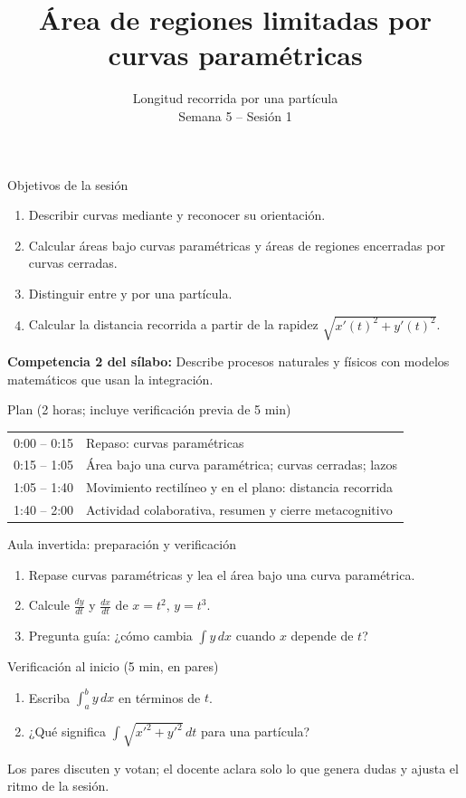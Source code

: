 \documentclass[10pt,aspectratio=169]{beamer}
\title[Paramétricas: área y distancia]{Área de regiones limitadas por curvas paramétricas}
\subtitle{Longitud recorrida por una partícula\\[2pt]\small Semana 5 -- Sesión 1}
\begin{document}
\begin{frame}
  \titlepage
\end{frame}

\begin{frame}{Objetivos de la sesión}
  \begin{enumerate}
    \item Describir curvas mediante  y reconocer su orientación.
    \item Calcular áreas bajo curvas paramétricas y áreas de regiones encerradas por curvas cerradas.
    \item Distinguir entre  y  por una partícula.
    \item Calcular la distancia recorrida a partir de la rapidez $\sqrt{x'(t)^2+y'(t)^2}$.
  \end{enumerate}
  \vspace{1mm}
  {\small\textbf{Competencia 2 del sílabo:} Describe procesos naturales y físicos con modelos matemáticos que usan la integración.}
  \begin{block}{Plan (2 horas; incluye verificación previa de 5 min)}
    \begin{tabular}{ll}
      0:00 -- 0:15 & Repaso: curvas paramétricas\\
      0:15 -- 1:05 & Área bajo una curva paramétrica; curvas cerradas; lazos\\
      1:05 -- 1:40 & Movimiento rectilíneo y en el plano: distancia recorrida\\
      1:40 -- 2:00 & Actividad colaborativa, resumen y cierre metacognitivo
    \end{tabular}
  \end{block}
\end{frame}

\begin{frame}{Aula invertida: preparación y verificación}
  \small
  \begin{previa}
    \begin{enumerate}
      \item Repase curvas paramétricas y lea el área bajo una curva paramétrica.
      \item Calcule $\frac{dy}{dt}$ y $\frac{dx}{dt}$ de $x=t^2$, $y=t^3$.
      \item Pregunta guía: ¿cómo cambia $\int y\,dx$ cuando $x$ depende de $t$?
    \end{enumerate}
  \end{previa}
  \begin{block}{Verificación al inicio (5 min, en pares)}
    \begin{enumerate}
      \item Escriba $\int_a^b y\,dx$ en términos de $t$.
      \item ¿Qué significa $\int\sqrt{x'^2+y'^2}\,dt$ para una partícula?
    \end{enumerate}
    Los pares discuten y votan; el docente aclara solo lo que genera dudas y ajusta el ritmo de la sesión.
  \end{block}
\end{frame}
\end{document}
